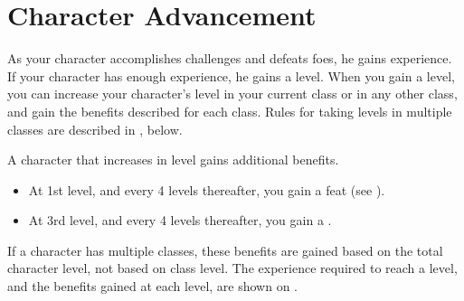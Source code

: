 \section{Character Advancement}\label{Character Advancement}

    As your character accomplishes challenges and defeats foes, he gains experience.
    If your character has enough experience, he gains a level.
    When you gain a level, you can increase your character's level in your current class or in any other class, and gain the benefits described for each class.
    Rules for taking levels in multiple classes are described in , below.

    A character that increases in level gains additional benefits.
    \begin{itemize}
        \item At 1st level, and every 4 levels thereafter, you gain a feat (see ).
        \item At 3rd level, and every 4 levels thereafter, you gain a .
    \end{itemize}

    If a character has multiple classes, these benefits are gained based on the total character level, not based on class level.
    The experience required to reach a level, and the benefits gained at each level, are shown on .

